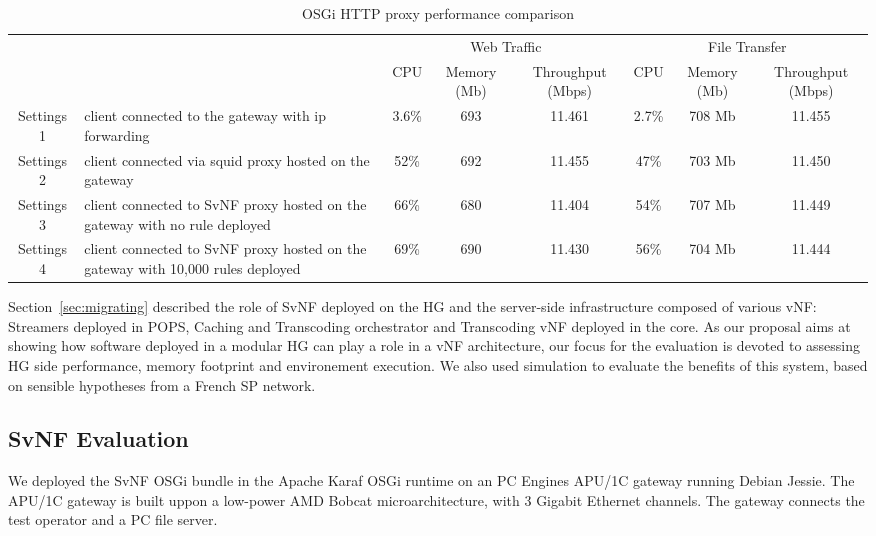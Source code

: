 \begin{table}
	\centering
	\begin{tabular}{| c | p{}|c |c |c || c |c |c |}
	
	
 	    \multicolumn{2}{c}{} & \multicolumn{3}{c}{Web Traffic} 		  & \multicolumn{3}{c}{File Transfer} \\
 	     \cline{3-8}	
             \multicolumn{2}{c|}{} & CPU 			& Memory (Mb) 		& Throughput (Mbps)	& CPU 		& Memory (Mb)		& Throughput (Mbps) \\\hline   
Settings 1 & client connected to the gateway with ip forwarding &   3.6\% 		& 693 		& 11.461		& 2.7\%		& 708 Mb		& 11.455 \\\hline
Settings 2 & client connected via squid proxy hosted on the gateway   &   52\%        & 692 		& 11.455		& 47\%		& 703 Mb		& 11.450 \\\hline
Settings 3 & client connected to SvNF proxy hosted on the gateway with no rule deployed &   66\%		& 680 		& 11.404		& 54\%		& 707 Mb		& 11.449 \\\hline
Settings 4 & client connected to SvNF proxy hosted on the gateway with 10,000 rules deployed   &   69\%        & 690 		& 11.430		& 56\%		& 704 Mb		& 11.444 \\\hline

	
	
	            
	\end{tabular}
	\caption{
	OSGi HTTP proxy performance comparison
	\label{tab:perf-comparison}
	}
	
\end{table}

Section~\ref{sec:migrating} described the role of SvNF deployed on the HG and the server-side infrastructure composed of various vNF: Streamers deployed in POPS, Caching and Transcoding orchestrator and Transcoding vNF deployed in the core.
As our proposal aims at showing how software deployed in a modular HG can play a role in a vNF architecture, our focus for the evaluation is devoted to assessing HG side performance, memory footprint and environement execution. We also used simulation to evaluate the benefits of this system, based on sensible hypotheses from a French SP network.


\subsection{SvNF Evaluation }\label{Testbed}

We deployed the SvNF OSGi bundle in the Apache Karaf OSGi runtime on an PC Engines APU/1C gateway running Debian Jessie. 
The APU/1C gateway is built uppon a low-power AMD Bobcat microarchitecture, with 3 Gigabit Ethernet channels. The gateway connects the test operator and a PC file server.

